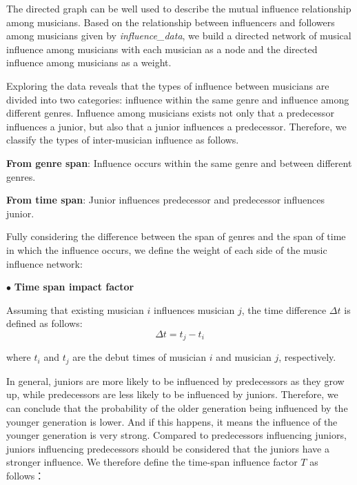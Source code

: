 \documentclass[12pt]{article}  %
\newenvironment{shrinkeq}[1]
{ \bgroup
	\addtolength\abovedisplayshortskip{#1}
	\addtolength\abovedisplayskip{#1}
	\addtolength\belowdisplayshortskip{#1}
	\addtolength\belowdisplayskip{#1}}
{\egroup\ignorespacesafterend}
\begin{document}
The directed graph can be well used to describe the mutual influence relationship among musicians. Based on the relationship between influencers and followers among musicians given by \emph{influence\_data}, we build a directed network of musical influence among musicians with each musician as a node and the directed influence among musicians as a weight.

Exploring the data reveals that the types of influence between musicians are divided into two categories: influence within the same genre and influence among different genres. Influence among musicians exists not only that a predecessor influences a junior, but also that a junior influences a predecessor. Therefore, we classify the types of inter-musician influence as follows.

\textbf{From genre span}: Influence occurs within the same genre and between different genres.

\textbf{From time span}: Junior influences predecessor and predecessor influences junior.


Fully considering the difference between the span of genres and the span of time in which the influence occurs, we define the weight of each side of the music influence network:

$\bullet$ \textbf{Time span impact factor}

Assuming that existing musician $i$ influences musician $j$, the time difference $\Delta t$ is defined as follows:
\vspace{-0.1cm}
\begin{shrinkeq}{-1.5ex}
	\begin{equation}
	\Delta t=t_j-t_i
	\end{equation}
\end{shrinkeq}


where $t_i$ and $t_j$ are the debut times of musician $i$ and musician $j$, respectively.

In general, juniors are more likely to be influenced by predecessors as they grow up, while predecessors are less likely to be influenced by juniors. Therefore, we can conclude that the probability of the older generation being influenced by the younger generation is lower. And if this happens, it means the influence of the younger generation is very strong. Compared to predecessors influencing juniors, juniors influencing predecessors should be considered that the juniors have a stronger influence. We therefore define the time-span influence factor $T$ as follows：
\end{document}
